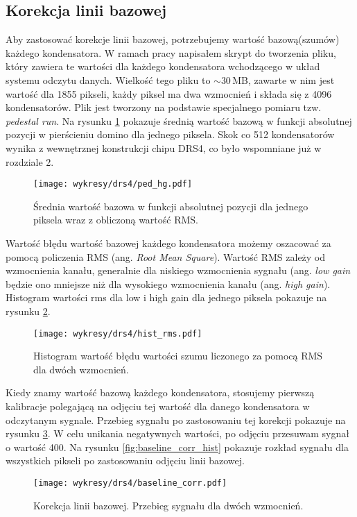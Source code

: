 \documentclass[a4paper,11pt,twoside]{article}
\begin{document}
\subsection{Korekcja linii bazowej}
Aby zastosować korekcje linii bazowej, potrzebujemy wartość bazową(szumów) każdego kondensatora. W ramach pracy napisałem skrypt do tworzenia pliku, który zawiera te wartości dla każdego kondensatora wchodzącego w układ systemu odczytu danych. Wielkość tego pliku to $\sim 30$\,MB, zawarte w nim jest wartość dla 1855 pikseli, każdy piksel ma dwa wzmocnień i składa się z 4096 kondensatorów. Plik jest tworzony na podstawie specjalnego pomiaru tzw. \textsl{pedestal run}. Na rysunku \ref{fig:ped_4096} pokazuje średnią wartość bazową w funkcji absolutnej pozycji w pierścieniu domino dla jednego piksela. Skok co 512 kondensatorów wynika z wewnętrznej konstrukcji chipu DRS4, co było wspomniane już w rozdziale 2.
\begin{figure}[H] 
\centering
\texttt{[image: wykresy/drs4/ped\_hg.pdf]}
\caption{Średnia wartość bazowa w funkcji absolutnej pozycji dla jednego piksela wraz z obliczoną wartość RMS.}
\label{fig:ped_4096}
\end{figure}
\newpage
Wartość błędu wartość bazowej każdego kondensatora możemy oszacować za pomocą policzenia RMS (ang. \textsl{Root Mean Square}). Wartość RMS zależy od wzmocnienia kanału, generalnie dla niskiego wzmocnienia sygnału (ang. \textsl{low gain} będzie ono mniejsze niż dla wysokiego wzmocnienia kanału (ang. \textsl{high gain}). Histogram wartości rms dla low i high gain dla jednego piksela pokazuje na rysunku \ref{fig:hist_rms}.
\begin{figure}[H] 
\centering
\texttt{[image: wykresy/drs4/hist\_rms.pdf]}
\caption{Histogram wartość błędu wartości szumu liczonego za pomocą RMS dla dwóch wzmocnień.}
\label{fig:hist_rms}
\end{figure}
Kiedy znamy wartość bazową każdego kondensatora, stosujemy pierwszą kalibracje polegającą na odjęciu tej wartość dla danego kondensatora w odczytanym sygnale. Przebieg sygnału po zastosowaniu tej korekcji pokazuje na rysunku \ref{fig:baseline_corr}. W celu unikania negatywnych wartości, po odjęciu przesuwam sygnał o wartość 400. Na rysunku \ref{fig:baseline_corr_hist} pokazuje rozkład sygnału dla wszystkich pikseli po zastosowaniu odjęciu linii bazowej.
\begin{figure}[H] 
\centering
\texttt{[image: wykresy/drs4/baseline\_corr.pdf]}
\caption{Korekcja linii bazowej. Przebieg sygnału dla dwóch wzmocnień.}
\label{fig:baseline_corr}
\end{figure}
\end{document}
